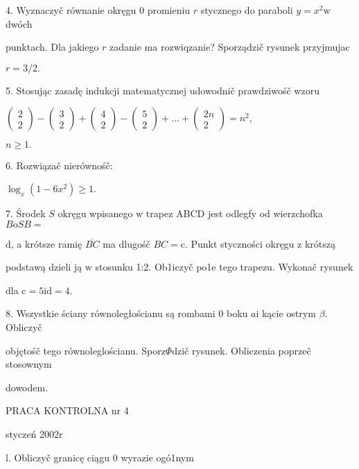 \documentclass[a4paper,12pt]{article}
\begin{document}
4. Wyznaczyč równanie okręgu $0$ promieniu $r$ stycznego do paraboli $y=x^{2}\mathrm{w}$ dwóch

punktach. Dla jakiego $r$ zadanie ma rozwiqzanie? Sporządzič rysunek przyjmujac

$r=3/2.$

5. Stosując zasadę indukcji matematycznej udowodnič prawdziwośč wzoru

$\left(\begin{array}{l}
2\\
2
\end{array}\right) - \left(\begin{array}{l}
3\\
2
\end{array}\right) + \left(\begin{array}{l}
4\\
2
\end{array}\right) - \left(\begin{array}{l}
5\\
2
\end{array}\right) +\ldots+\left(\begin{array}{l}
2n\\
2
\end{array}\right) =n^{2},$

$n\geq 1.$

6. Rozwiązač nierównośč:

$\log_{x}(1-6x^{2})\geq 1.$

7. Środek $S$ okręgu wpisanego $\mathrm{w}$ trapez ABCD jest odlegfy od wierzchofka $B\mathrm{o}SB=$

$\mathrm{d}$, a krótsze ramię $\overline{BC}$ ma dlugośč $BC = \mathrm{c}$. Punkt styczności okręgu $\mathrm{z}$ krótszą

podstawą dzieli ją $\mathrm{w}$ stosunku 1:2. Ob1iczyč po1e tego trapezu. Wykonač rysunek

dla $\mathrm{c}=5\mathrm{i}\mathrm{d}=4.$

8. Wszystkie ściany równoległościanu są rombami $0$ boku $a\mathrm{i}$ kącie ostrym $\beta$. Obliczyč

objętośč tego równoleglościanu. Sporz$\Phi$dzič rysunek. Obliczenia poprzeč stosownym

dowodem.





PRACA KONTROLNA nr 4

styczeń 2002r

l. Obliczyč granicę ciągu 0 wyrazie ogó1nym
\end{document}
